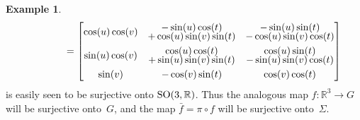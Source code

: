\documentclass[pdftex]{sigma}
\numberwithin{equation}{section}
\theoremstyle{definition}
\newtheorem{exmpl}[teo]{Example}
\begin{document}
\begin{exmpl}
\begin{gather*}
\hphantom{f(u,v,t)}{} =
\begin{bmatrix}
\cos(u) \cos(v) & \begin{array}{@{}c@{}} -\sin(u) \cos(t)\vspace{-1mm}\\+ \cos(u) \sin(v) \sin(t)\end{array} & \begin{array}{@{}c@{}} -\sin(u) \sin(t)\vspace{-1mm}\\ - \cos(u) \sin(v) \cos(t)\end{array}
\vspace{1mm}\\
\sin(u) \cos(v) & \begin{array}{@{}c@{}} \cos(u) \cos(t)\vspace{-1mm}\\ + \sin(u) \sin(v) \sin(t)\end{array} & \begin{array}{@{}c@{}} \cos(u) \sin(t)\vspace{-1mm}\\- \sin(u) \sin(v) \cos(t)\end{array}
\vspace{1mm}\\
\sin(v) & -\cos(v) \sin(t) & \cos(v) \cos(t)
\end{bmatrix}
\end{gather*}
is easily seen to be surjective onto ${\rm SO}(3,\mathbb{R})$.
Thus the analogous map $f:\mathbb{R}^3 \to G$ will be surjective onto~$G$, and the map $\bar{f} = \pi \circ f$ will be
surjective onto~$\Sigma$.


\end{exmpl}
\end{document}

